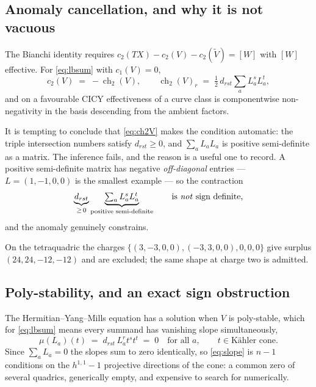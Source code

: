 \documentclass[11pt,a4paper]{article}
\newcommand{\ch}{\operatorname{ch}}
\theoremstyle{definition}
\begin{document}
\subsection{Anomaly cancellation, and why it is not vacuous}

The Bianchi identity requires $c_2(TX) - c_2(V) - c_2(\tilde V) = [W]$ with
$[W]$ effective. For \cref{eq:lbsum} with $c_1(V) = 0$,
%
\begin{equation}
c_2(V) \;=\; -\ch_2(V) ,
\qquad
\ch_2(V)_r \;=\; \tfrac{1}{2}\, d_{rst} \sum_a L_a^s L_a^t ,
\label{eq:ch2V}
\end{equation}
%
and on a favourable CICY effectiveness of a curve class is componentwise
non-negativity in the basis descending from the ambient factors.

It is tempting to conclude that \cref{eq:ch2V} makes the condition automatic:
the triple intersection numbers satisfy $d_{rst} \ge 0$, and
$\sum_a L_a L_a$ is positive semi-definite as a matrix. The inference fails,
and the reason is a useful one to record. A positive semi-definite matrix has
negative \emph{off-diagonal} entries --- $L = (1,-1,0,0)$ is the smallest
example --- so the contraction
%
\begin{equation}
\underbrace{d_{rst}}_{\ge\,0}
\underbrace{\textstyle\sum_a L_a^s L_a^t}_{\text{positive semi-definite}}
\qquad\text{is \emph{not} sign definite,}
\end{equation}
%
and the anomaly genuinely constrains. 

On the tetraquadric the charges
$\{(3,-3,0,0), (-3,3,0,0), 0,0,0\}$ 
\newline give surplus $(24,24,-12,-12)$ and are excluded; the same shape at charge two is admitted.

\subsection{Poly-stability, and an exact sign obstruction}
\label{sec:slopeobstruction}

The Hermitian--Yang--Mills equation has a solution when $V$ is poly-stable,
which for \cref{eq:lbsum} means every summand has vanishing slope
simultaneously,
%
\begin{equation}
\mu(L_a)(t) \;=\; d_{rst}\, L_a^r t^s t^t \;=\; 0
\quad\text{for all } a,
\qquad t \in \text{K\"ahler cone} .
\label{eq:slope}
\end{equation}
%
Since $\sum_a L_a = 0$ the slopes sum to zero identically, so \cref{eq:slope}
is $n-1$ conditions on the $h^{1,1}-1$ projective directions of the cone: a
common zero of several quadrics, generically empty, and expensive to search
for numerically.
\end{document}
